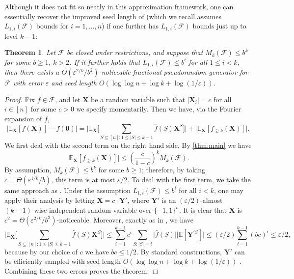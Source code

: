 \documentclass[10pt,a4paper]{article}
\newcommand{\eps}{\varepsilon}
\newtheorem{THM}[theorem]{Theorem}
\theoremstyle{definition}
\begin{document}
Although it does not fit so neatly in this approximation framework, one can essentially recover the improved seed length of \cite{CHHL} (which we recall assumes $L_{1,i}(\mathcal{F})$ bounds for $i=1,\ldots, n$) if one further has $L_{1,i}(\mathcal{F})$ bounds just up to level $k-1$:
\begin{THM}
\label{thm:l1bounds}
        Let $\mathcal{F}$ be closed under restrictions, and suppose that $M_k(\mathcal{F})\leq b^k$ for some $b\geq 1$, $k>2$. If it further holds that $L_{1,i}(\mathcal{F})\leq b^{i}$ for all $1\leq i<k$, then there exists a $\Theta(\eps^{2/k}/b^2)$-noticeable fractional pseudorandom generator for $\mathcal{F}$ with error $\eps$ and seed length $O(\log\log n +\log k+\log(1/\eps))$.
    \end{THM}
    \begin{proof}
    Fix $f\in \mathcal{F}$, and let $\mathbf{X}$ be a random variable such that $\vert \mathbf{X}_i\vert=c$ for all $i \in [n]$ for some $c>0$ we specify momentarily. Then we have, via the Fourier expansion of $f$,
\begin{equation*}
    \bigl| \mathbb{E}_{\mathbf{X}}[f(\mathbf{X})]-f(\mathbf{0}) \bigr|
    = \Biggl| \mathbb{E}_{\mathbf{X}} \Biggl[ \sum_{S\subseteq [n]:1\leq \vert S\vert\leq k-1}\hat{f}(S)\mathbf{X}^S \Biggr] \Biggr|
    + \bigl| \mathbb{E}_{\mathbf{X}}[f_{\geq k}(\mathbf{X})] \bigr| .
\end{equation*}
We first deal with the second term on the right hand side.  By \cref{thm:main} we have
\begin{equation*}
    \bigl| \mathbb{E}_{\mathbf{X}}[f_{\geq k}(\mathbf{X})] \bigr|
    \leq \left(\frac{c}{1-c}\right)^k M_k(\mathcal{F}).
\end{equation*}
By assumption, $M_k(\mathcal{F})\leq b^k$ for some $b\geq 1$; therefore, by taking $c=\Theta(\eps^{1/k}/b)$, this term is at most $\eps/2$. To deal with the first term, we take the same approach as \cite{CHHL}. Under the assumption $L_{1,i}(\mathcal{F})\leq b^i$ for all $i<k$, one may apply their analysis by letting $\mathbf{X}=c\cdot \mathbf{Y}'$, where $\mathbf{Y}'$ is an $(\eps/2)$-almost $(k-1)$-wise independent random variable over $\{-1,1\}^n$.  It is clear that $\mathbf{X}$ is $c^2 = \Theta(\eps^{2/k}/b^2)$-noticeable.  Moreover, exactly as in \cite{CHHL}, we have
\begin{equation*}
    \Biggl| \mathbb{E}_{\mathbf{X}}\Biggl[\sum_{S\subseteq [n]:1\leq \vert S\vert\leq k-1}\hat{f}(S)\mathbf{X}^S\Biggr] \Biggr|
    \leq \sum_{i=1}^{k-1} c^i\sum_{S:\vert S\vert=i} \bigl| \hat{f}(S) \bigr| \bigl| \mathbb{E}[\mathbf{Y}^{'S}] \bigr| 
    \leq (\eps/2) \sum_{i=1}^{k-1} (bc)^i\leq \eps/2,
\end{equation*}
because by our choice of $c$ we have $bc \leq 1/2$. By standard constructions, $\mathbf{Y}'$ can be efficiently sampled with seed length $O(\log\log n +\log k+\log(1/\eps))$ \cite{naor1993small}.  Combining these two errors proves the theorem.
\end{proof}
\end{document}
